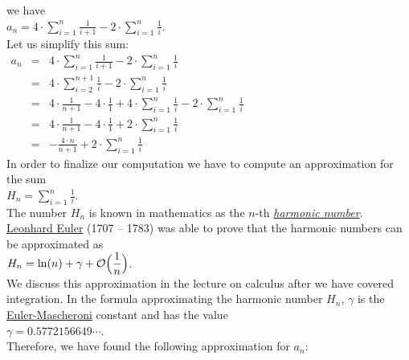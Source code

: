 we have
\\[0.2cm]
\hspace*{1.3cm}
$\displaystyle a_{n} = 4 \cdot \sum\limits_{i=1}^n \frac{1}{i+1} - 2 \cdot \sum\limits_{i=1}^n \frac{1}{i}$.  
\\[0.2cm]
Let us simplify this sum:
\\[0.2cm]
\hspace*{1.3cm}
$
\begin{array}{lcl}
 a_{n} & = & \displaystyle 4 \cdot \sum_{i=1}^n \frac{1}{i+1} - 2 \cdot \sum_{i=1}^n \frac{1}{i} \\[0.5cm]
       & = & \displaystyle 4 \cdot \sum_{i=2}^{n+1} \frac{1}{i} - 2 \cdot \sum_{i=1}^n \frac{1}{i} \\[0.5cm]
       & = & \displaystyle 4 \cdot \frac{1}{n+1} - 4 \cdot \frac{1}{1} + 4 \cdot \sum_{i=1}^{n} \frac{1}{i} - 2 \cdot \sum_{i=1}^n \frac{1}{i} \\[0.5cm]
       & = & \displaystyle 4 \cdot \frac{1}{n+1} - 4 \cdot \frac{1}{1} + 2 \cdot \sum_{i=1}^{n} \frac{1}{i}  \\[0.5cm]
       & = & \displaystyle - \frac{4 \cdot n}{n+1}  + 2 \cdot \sum_{i=1}^{n} \frac{1}{i}  
\end{array}
$
\\[0.2cm]
In order to finalize our computation we have to compute an approximation for the sum
\\[0.2cm]
\hspace*{1.3cm}
$H_n = \displaystyle\sum\limits_{i=1}^{n}\frac{1}{i}$.
\\[0.2cm] 
The number $H_n$ is known in mathematics as the $n$-th 
\href{http://en.wikipedia.org/wiki/Harmonic_number}{\emph{harmonic number}}.
\href{http://en.wikipedia.org/wiki/Leonhard_Euler}{Leonhard Euler} (1707 -- 1783) was able to prove
that the harmonic numbers can be approximated as
\\[0.2cm]
\hspace*{1.3cm}
$\displaystyle H_n = \ln(n) + \gamma + \mathcal{O}\Bigl(\frac{1}{n}\Bigr)$. 
\\[0.2cm] 
We discuss this approximation in the lecture on calculus after we have covered integration.  In the
formula approximating the harmonic number $H_n$, $\gamma$ is the
\href{http://en.wikipedia.org/wiki/Euler-Mascheroni_constant}{Euler-Mascheroni} constant and has the 
value
\\[0.2cm]
\hspace*{1.3cm}
$\gamma = 0.5772156649 \cdots$.
\\[0.2cm]
Therefore, we have found the following approximation for $a_n$:
